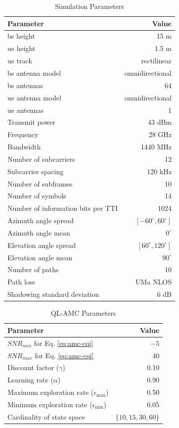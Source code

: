 \begin{table}[htb]
\centering
\caption{Simulation Parameters}
\label{tab:amc-sim-params}
\begin{tabularx}{0.8\columnwidth}{X r}
\toprule
\textbf{Parameter} 	& \textbf{Value} \\
\midrule
\gls{bs} height & 15 m\\
\gls{ue} height & 1.5 m\\
\gls{ue} track & rectilinear\\
\gls{bs}  antenna model & omnidirectional \\
\gls{bs}  antennas & 64 \\
\gls{ue} antenna model & omnidirectional \\
\gls{ue} antennas & 1 \\
Transmit power & 43 dBm\\
Frequency & 28 GHz\\
Bandwidth & 1440 MHz\\
Number of subcarriers  & 12\\
Subcarrier spacing & 120 kHz\\
Number of subframes & 10\\
Number of symbols & 14\\
Number of information bits per TTI & 1024\\
Azimuth angle spread & $[-60^{\circ}, 60^{\circ}]$\\
Azimuth angle mean & $0^{\circ}$\\
Elevation angle spread & $[60^{\circ}, 120^{\circ}]$\\
Elevation angle mean & $90^{\circ}$\\

Number of paths & 10\\
Path loss & UMa NLOS\\
Shadowing standard deviation & 6 dB\\
\bottomrule
\end{tabularx}
\end{table}
%


\begin{table}[htb]
	\centering
	\caption{QL-AMC Parameters}
	\label{tab:amc-rl-params}
	\begin{tabularx}{0.8\columnwidth}{l r}
		\toprule
		\textbf{Parameter} 	   & \textbf{Value} \\
    \midrule
    $SNR_{min}$ for Eq. \eqref{eq:amc-cqi} & $-5$ \\
    $SNR_{max}$ for Eq. \eqref{eq:amc-cqi} & $40$ \\
		Discount factor ($\gamma$) & 0.10\\
		Learning rate ($\alpha$) & 0.90\\
		Maximum exploration rate ($\epsilon_{\max}$) & 0.50\\
    Minimum exploration rate ($\epsilon_{\min}$) & 0.05\\
    Cardinality of state space & $\{10,15,30,60 \}$\\
		\bottomrule
	\end{tabularx}
\end{table}

